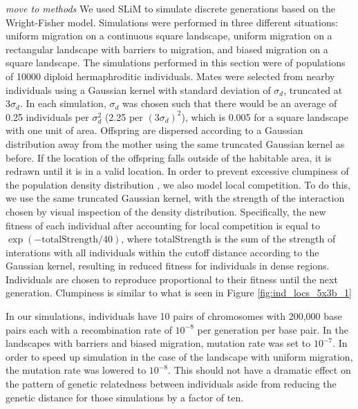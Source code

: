\documentclass{article}
\newcommand{\plr}[1]{{\em \color{blue} #1}}
\begin{document}
\plr{move to methods}
We used SLiM to simulate discrete generations based on the Wright-Fisher model.
Simulations were performed in three different situations:
uniform migration on a continuous square landscape, 
uniform migration on a rectangular landscape with barriers to migration, 
and biased migration on a square landscape.
The simulations performed in this section 
were of populations of 10000 diploid hermaphroditic individuals.
Mates were selected from nearby individuals using a Gaussian kernel 
with standard deviation of $\sigma_{d}$,
truncated at $3 \sigma_{d}$.
In each simulation,
$\sigma_{d}$ was chosen such that there would be an average of 
0.25 individuals per $\sigma_{d}^2$ (2.25 per $(3 \sigma_{d})^2$),
which is 0.005 for a square landscape with one unit of area.
Offspring are dispersed according to a Gaussian distribution away from the mother
using the same truncated Gaussian kernel as before.
If the location of the offspring falls outside of the habitable area, 
it is redrawn until it is in a valid location.
In order to prevent excessive clumpiness of the population density distribution \citep{felsensten1975pain}, 
we also model local competition. 
To do this, we use the same truncated Gaussian kernel,
with the strength of the interaction chosen 
by visual inspection of the density distribution.
Specifically, the new fitness of each individual after accounting for local competition
is equal to $\exp{(-\text{totalStrength}/40)}$,
where totalStrength is the sum of the strength of interations with all individuals
within the cutoff distance according to the Gaussian kernel,
resulting in reduced fitness for individuals in dense regions.
Individuals are chosen to reproduce proportional to their fitness until the next generation.
Clumpiness is similar to what is seen in 
Figure \ref{fig:ind_locs_5x3b_1}

In our simulations, individuals have 10 pairs of chromosomes with 200,000 base pairs each 
with a recombination rate of $10^{-8}$ per generation per base pair.
In the landscapes with barriers and biased migration,
mutation rate was set to $10^{-7}$.
In order to speed up simulation in the case of the landscape with uniform migration,
the mutation rate was lowered to $10^{-8}$.
This should not have a dramatic effect on the pattern of genetic relatedness between individuals
aside from reducing the genetic distance for those simulations by a factor of ten.
\end{document}
